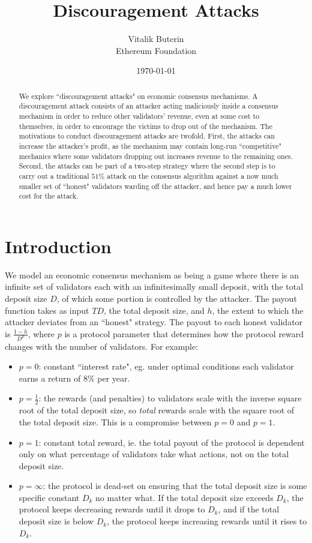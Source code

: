 \documentclass[12pt]{article}
\title{Discouragement Attacks}
\author{
        Vitalik Buterin \\
        Ethereum Foundation
}
\date{\today}
\begin{document}
\maketitle
\begin{abstract}
We explore ``discouragement attacks" on economic consensus mechanisms. A discouragement attack consists of an attacker acting maliciously inside a consensus mechanism in order to reduce other validators' revenue, even at some cost to themselves, in order to encourage the victims to drop out of the mechanism. The motivations to conduct discouragement attacks are twofold. First, the attacks can increase the attacker's profit, as the mechanism may contain long-run ``competitive" mechanics where some validators dropping out increases revenue to the remaining ones. Second, the attacks can be part of a two-step strategy where the second step is to carry out a traditional $51\%$ attack on the consensus algorithm against a now much smaller set of ``honest" validators warding off the attacker, and hence pay a much lower cost for the attack.
\end{abstract}

\section{Introduction}
We model an economic consensus mechanism as being a game where there is an infinite set of validators each with an infinitesimally small deposit, with the total deposit size $D$, of which some portion is controlled by the attacker. The payout function takes as input $TD$, the total deposit size, and $h$, the extent to which the attacker deviates from an ``honest" strategy. The payout to each honest validator is $\frac{1-h}{D^p}$, where $p$ is a protocol parameter that determines how the protocol reward changes with the number of validators. For example:

\begin{itemize}
\item $p=0$: constant ``interest rate", eg. under optimal conditions each validator earns a return of $8\%$ per year.
\item $p=\frac{1}{2}$: the rewards (and penalties) to validators scale with the inverse square root of the total deposit size, so \textit{total} rewards scale with the square root of the total deposit size. This is a compromise between $p=0$ and $p=1$. 
\item $p=1$: constant total reward, ie. the total payout of the protocol is dependent only on what percentage of validators take what actions, not on the total deposit size.
\item $p=\infty$: the protocol is dead-set on ensuring that the total deposit size is some specific constant $D_k$ no matter what. If the total deposit size exceeds $D_k$, the protocol keeps decreasing rewards until it drops to $D_k$, and if the total deposit size is below $D_k$, the protocol keeps increasing rewards until it rises to $D_k$.
\end{itemize}
\end{document}

